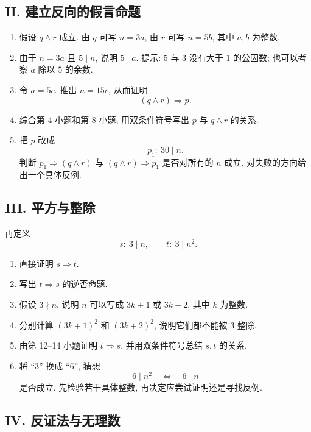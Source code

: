\documentclass[usesamecnt, thmcnt=section, lang=cn, newtx, 10pt, scheme=chinese]{elegantbook}
\begin{document}
\subsection*{II. 建立反向的假言命题}

\begin{enumerate}[label=\textbf{\arabic*.}, resume=comprehensive]
  \item 假设 $q\wedge r$ 成立. 由 $q$ 可写 $n=3a$, 由 $r$ 可写 $n=5b$, 其中 $a,b$ 为整数.
  \item 由于 $n=3a$ 且 $5\mid n$, 说明 $5\mid a$. 提示: $5$ 与 $3$ 没有大于 $1$ 的公因数; 也可以考察 $a$ 除以 $5$ 的余数.
  \item 令 $a=5c$. 推出 $n=15c$, 从而证明
  \[
    (q\wedge r)\Rightarrow p.
  \]
  \item 综合第 4 小题和第 8 小题, 用双条件符号写出 $p$ 与 $q\wedge r$ 的关系.
  \item 把 $p$ 改成
  \[
    p_1:\ 30\mid n.
  \]
  判断 $p_1\Rightarrow(q\wedge r)$ 与 $(q\wedge r)\Rightarrow p_1$ 是否对所有的 $n$ 成立. 对失败的方向给出一个具体反例.
\end{enumerate}

\subsection*{III. 平方与整除}

再定义
\[
 s:\ 3\mid n,
 \qquad
 t:\ 3\mid n^2.
\]

\begin{enumerate}[label=\textbf{\arabic*.}, resume=comprehensive]
  \item 直接证明 $s\Rightarrow t$.
  \item 写出 $t\Rightarrow s$ 的逆否命题.
  \item 假设 $3\nmid n$. 说明 $n$ 可以写成 $3k+1$ 或 $3k+2$, 其中 $k$ 为整数.
  \item 分别计算 $(3k+1)^2$ 和 $(3k+2)^2$, 说明它们都不能被 $3$ 整除.
  \item 由第 12--14 小题证明 $t\Rightarrow s$, 并用双条件符号总结 $s,t$ 的关系.
  \item 将 ``$3$'' 换成 ``$6$'', 猜想
  \[
    6\mid n^2\quad\Leftrightarrow\quad6\mid n
  \]
  是否成立. 先检验若干具体整数, 再决定应尝试证明还是寻找反例.
\end{enumerate}

\subsection*{IV. 反证法与无理数}
\end{document}
